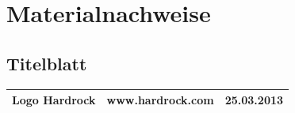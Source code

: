 \documentclass[ngerman,a4paper,12pt]{scrreprt}
\begin{document}
\listoffigures

\begin{landscape}
%
\end{landscape}

\chapter{Materialnachweise}
\section{Titelblatt}
\begin{tabularx}{\textwidth}{|Xlr|}
		\hline
		Logo Hardrock & www.hardrock.com & 25.03.2013 \\
		\hline
\end{tabularx}
\end{document}
